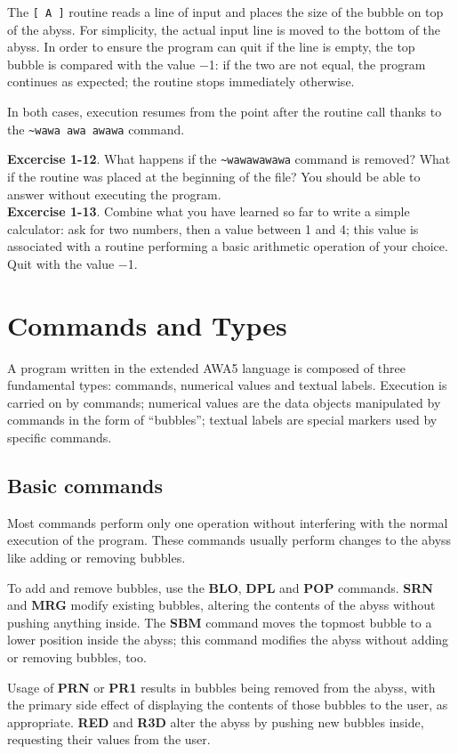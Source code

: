 \documentclass[11pt,a4paper,draft]{book}
\begin{document}
The \verb|[ A ]| routine reads a line of input and places the size of
the bubble on top of the abyss. For simplicity, the actual input line
is moved to the bottom of the abyss.  In order to ensure the program
can quit if the line is empty, the top bubble is compared with the
value \num{-1}: if the two are not equal, the program continues as
expected; the routine stops immediately otherwise.

In both cases, execution resumes from the point after the routine call
thanks to the \verb|~wawa awa awawa| command.

\textbf{Excercise 1-12}. What happens if the \verb|~wawawawawa|
command is removed? What if the routine was placed at the beginning of
the file? You should be able to answer without executing the
program. \\
\textbf{Excercise 1-13}. Combine what you have learned so far to write
a simple calculator: ask for two numbers, then a value between \num{1}
and \num{4}; this value is associated with a routine performing a
basic arithmetic operation of your choice. Quit with the value \num{-1}.

\chapter{Commands and Types}
A program written in the extended AWA5 language is composed of three
fundamental types: commands, numerical values and textual labels.
Execution is carried on by commands; numerical values are the data
objects manipulated by commands in the form of \enquote{bubbles};
textual labels are special markers used by specific commands.

\section{Basic commands}
Most commands perform only one operation without interfering with the
normal execution of the program. These commands usually perform
changes to the abyss like adding or removing bubbles.

To add and remove bubbles, use the \textbf{BLO}, \textbf{DPL} and
\textbf{POP} commands. \textbf{SRN} and \textbf{MRG} modify existing
bubbles, altering the contents of the abyss without pushing anything
inside. The \textbf{SBM} command moves the topmost bubble to a lower
position inside the abyss; this command modifies the abyss without
adding or removing bubbles, too.

Usage of \textbf{PRN} or \textbf{PR1} results in bubbles being removed
from the abyss, with the primary side effect of displaying the
contents of those bubbles to the user, as appropriate.  \textbf{RED}
and \textbf{R3D} alter the abyss by pushing new bubbles inside,
requesting their values from the user.
\end{document}
